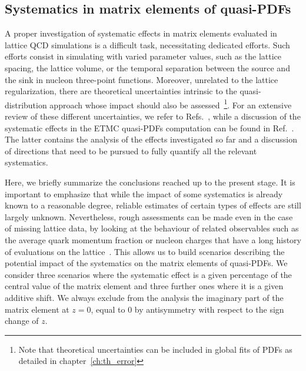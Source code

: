\subsection{Systematics in matrix elements of quasi-PDFs}
\label{subsec:sys}

A proper investigation of systematic effects in matrix elements evaluated in
lattice QCD simulations is a difficult task, necessitating dedicated efforts.
Such efforts consist in simulating with varied parameter values, such as the
lattice spacing, the lattice volume, or the temporal separation between the
source and the sink in nucleon three-point functions. Moreover, unrelated to the
lattice regularization, there are theoretical uncertainties intrinsic to the
quasi-distribution approach whose impact should also be assessed~\footnote{Note
that theoretical uncertainties can be included in global fits of PDFs as
detailed in chapter~\ref{ch:th_error}}. For an extensive review of these
different uncertainties, we refer to Refs.~\cite{Cichy:2018mum,Monahan:2018euv},
while a discussion of the systematic effects in the ETMC quasi-PDFs computation
can be found in Ref.~\cite{Alexandrou:2019lfo}. The latter contains the analysis
of the effects investigated so far and a discussion of directions that need to
be pursued to fully quantify all the relevant systematics.

Here, we briefly summarize the conclusions reached up to the present stage. It
is important to emphasize that while the impact of some systematics is already
known to a reasonable degree, reliable estimates of certain types of effects are
still largely unknown. Nevertheless, rough assessments can be made even in the
case of missing lattice data, by looking at the behaviour of related observables
such as the average quark momentum fraction or nucleon charges that have a long
history of evaluations on the
lattice~\cite{Syritsyn:2014saa,Constantinou:2014tga,Constantinou:2015agp,Alexandrou:2015xts,Green:2018vxw}.
This allows us to build scenarios describing the potential impact of the
systematics on the matrix elements of quasi-PDFs. We consider three scenarios
where the systematic effect is a given percentage of the central value of the
matrix element and three further ones where it is a given additive shift. We
always exclude from the analysis the imaginary part of the matrix element at
$z=0$, equal to 0 by antisymmetry with respect to the sign change of $z$.

